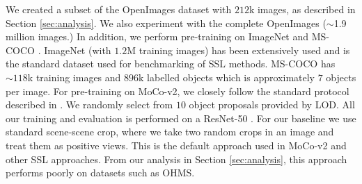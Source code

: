 

We created a subset of the OpenImages dataset with $212$k images, as described in Section \ref{sec:analysis}. We also experiment with the complete OpenImages ($\sim$1.9 million images.)
In addition, we perform pre-training on ImageNet \cite{imagenet_cvpr09} and MS-COCO \cite{Lin2014MicrosoftCC}.
ImageNet (with $1.2$M training images) has been extensively used and is the standard dataset used for benchmarking of SSL methods. MS-COCO has $\sim118$k training images and $896$k labelled objects which is approximately $7$ objects per image. For pre-training on MoCo-v2, we closely follow the standard protocol described in \citet{chen2020improved}. We randomly select from $10$ object proposals provided by LOD. All our training and evaluation is performed on a ResNet-50 \cite{He2015}. For our baseline we use standard scene-scene crop, where we take two random crops in an image and treat them as positive views. This is the default approach used in MoCo-v2 and other SSL approaches. From our analysis in Section \ref{sec:analysis}, this approach performs poorly on datasets such as OHMS. 


